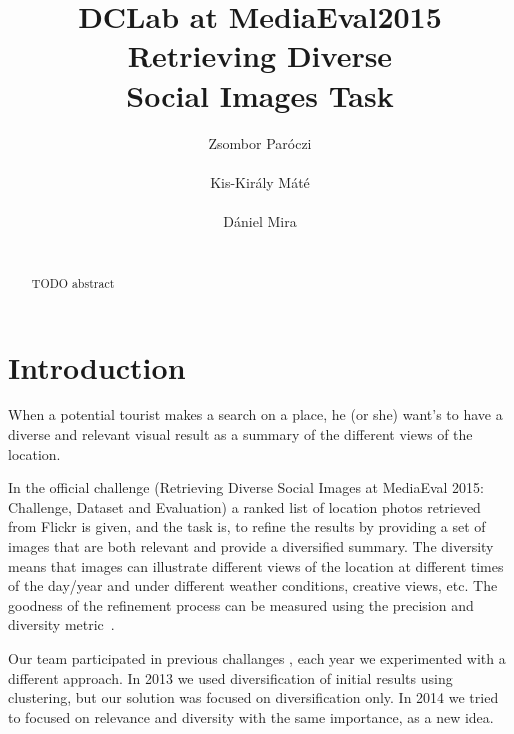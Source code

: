 \documentclass{sig-alternate}
\begin{document}

\title{DCLab at MediaEval2015 Retrieving Diverse \\ Social Images Task}


\author{
\alignauthor
Zsombor Par\'oczi\\
       \\
\alignauthor
Kis-Kir\'aly M\'at\'e \\
		\\
\alignauthor
D\'aniel Mira\\
		\\
}

\maketitle
\begin{abstract}
TODO abstract
\end{abstract}

\section{Introduction}

When a potential tourist makes a search on a place, he (or she) want's to have a diverse and relevant visual result as a summary of the different views of the location. 

In the official challenge (Retrieving Diverse Social Images at MediaEval 2015: Challenge, Dataset and Evaluation) \cite{Task2015} a ranked list of location photos retrieved from Flickr is given, and the task is, to refine the results by providing a set of images that are both relevant and provide a diversified summary. The diversity means that images can illustrate different views of the location at different times of the day/year and under different weather conditions, creative views, etc. The goodness of the refinement process can be measured using the precision and diversity metric~\cite{Taneva:2010:GRP:1718487.1718541}. 

Our team participated in previous challanges \cite{szHucs2013bmemtm,Paroczi2014}, each year we experimented with a different approach. In 2013 we used diversification of initial results using clustering, but our solution was focused on diversification only. In 2014 we tried to focused on relevance and diversity with the same importance, as a new idea.
\end{document}
